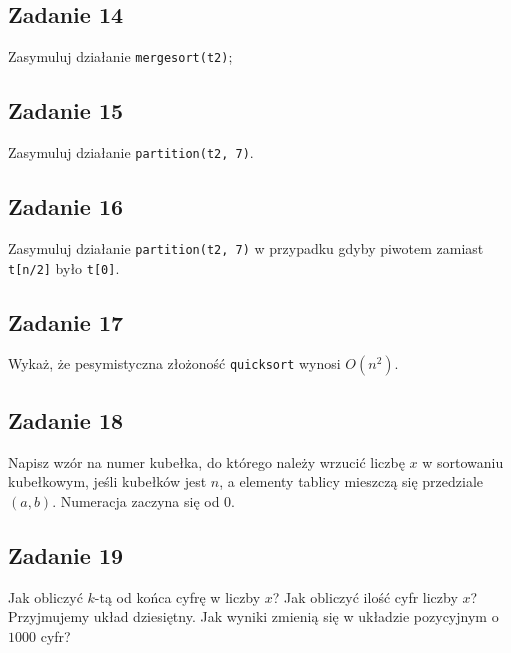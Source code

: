 \documentclass{article}
\begin{document}
\subsection*{Zadanie 14}
Zasymuluj działanie \verb+mergesort(t2)+;

\subsection*{Zadanie 15}
Zasymuluj działanie \verb+partition(t2, 7)+.

\subsection*{Zadanie 16}
Zasymuluj działanie \verb+partition(t2, 7)+ w przypadku gdyby piwotem zamiast \verb+t[n/2]+ było \verb+t[0]+.

\subsection*{Zadanie 17}
Wykaż, że pesymistyczna złożoność \verb+quicksort+ wynosi $O(n^2)$.

\subsection*{Zadanie 18}
Napisz wzór na numer kubełka, do którego należy wrzucić liczbę $x$ w sortowaniu
kubełkowym, jeśli kubełków jest $n$, a elementy tablicy mieszczą się przedziale $(a, b)$.
Numeracja zaczyna się od $0$.

\subsection*{Zadanie 19}
Jak obliczyć $k$-tą od końca cyfrę w liczby $x$? Jak obliczyć ilość cyfr liczby $x$?
Przyjmujemy układ dziesiętny. Jak wyniki zmienią się w układzie pozycyjnym o $1000$ cyfr?
\end{document}
